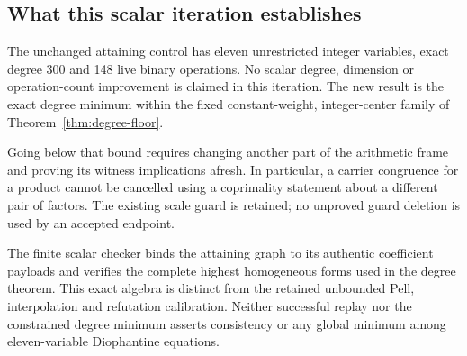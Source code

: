 \subsection{What this scalar iteration establishes}
The unchanged attaining control has eleven unrestricted integer variables,
exact degree 300 and 148 live binary operations. No scalar degree, dimension
or operation-count improvement is claimed in this iteration. The new result
is the exact degree minimum within the fixed constant-weight,
integer-center family of Theorem~\ref{thm:degree-floor}.

Going below that bound requires changing another part of the arithmetic
frame and proving its witness implications afresh. In particular, a
carrier congruence for a product cannot be cancelled using a coprimality
statement about a different pair of factors. The existing scale guard is
retained; no unproved guard deletion is used by an accepted endpoint.

The finite scalar checker binds the attaining graph to its authentic
coefficient payloads and verifies the complete highest homogeneous forms
used in the degree theorem. This exact algebra is distinct from the retained
unbounded Pell, interpolation and refutation calibration. Neither successful
replay nor the constrained degree minimum asserts consistency or any global
minimum among eleven-variable Diophantine equations.
